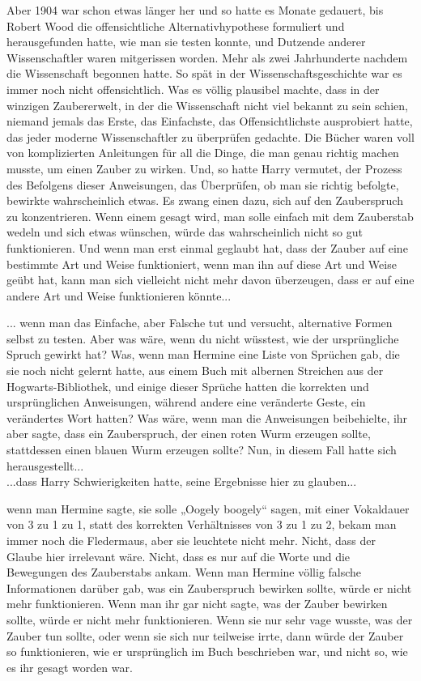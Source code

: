 {Aber 1904 war schon etwas länger her und so hatte es Monate gedauert, bis Robert Wood die offensichtliche Alternativhypothese formuliert und herausgefunden hatte, wie man sie testen konnte, und Dutzende anderer Wissenschaftler waren mitgerissen worden. Mehr als zwei Jahrhunderte nachdem die Wissenschaft begonnen hatte. So spät in der Wissenschaftsgeschichte war es immer noch nicht offensichtlich. Was es völlig plausibel machte, dass in der winzigen Zaubererwelt, in der die Wissenschaft nicht viel bekannt zu sein schien, niemand jemals das Erste, das Einfachste, das Offensichtlichste ausprobiert hatte, das jeder moderne Wissenschaftler zu überprüfen gedachte. Die Bücher waren voll von komplizierten Anleitungen für all die Dinge, die man genau richtig machen musste, um einen Zauber zu wirken. Und, so hatte Harry vermutet, der Prozess des Befolgens dieser Anweisungen, das Überprüfen, ob man sie richtig befolgte, bewirkte wahrscheinlich etwas. Es zwang einen dazu, sich auf den Zauberspruch zu konzentrieren. Wenn einem gesagt wird, man solle einfach mit dem Zauberstab wedeln und sich etwas wünschen, würde das wahrscheinlich nicht so gut funktionieren. Und wenn man erst einmal geglaubt hat, dass der Zauber auf eine bestimmte Art und Weise funktioniert, wenn man ihn auf diese Art und Weise geübt hat, kann man sich vielleicht nicht mehr davon überzeugen, dass er auf eine andere Art und Weise funktionieren könnte...

... wenn man das Einfache, aber Falsche tut und versucht, alternative Formen selbst zu testen. Aber was wäre, wenn du nicht wüsstest, wie der ursprüngliche Spruch gewirkt hat? Was, wenn man Hermine eine Liste von Sprüchen gab, die sie noch nicht gelernt hatte, aus einem Buch mit albernen Streichen aus der Hogwarts-Bibliothek, und einige dieser Sprüche hatten die korrekten und ursprünglichen Anweisungen, während andere eine veränderte Geste, ein verändertes Wort hatten? Was wäre, wenn man die Anweisungen beibehielte, ihr aber sagte, dass ein Zauberspruch, der einen roten Wurm erzeugen sollte, stattdessen einen blauen Wurm erzeugen sollte? Nun, in diesem Fall hatte sich herausgestellt...\\ ...dass Harry Schwierigkeiten hatte, seine Ergebnisse hier zu glauben...

wenn man Hermine sagte, sie solle „Oogely boogely“ sagen, mit einer Vokaldauer von 3 zu 1 zu 1, statt des korrekten Verhältnisses von 3 zu 1 zu 2, bekam man immer noch die Fledermaus, aber sie leuchtete nicht mehr. Nicht, dass der Glaube hier irrelevant wäre. Nicht, dass es nur auf die Worte und die Bewegungen des Zauberstabs ankam. Wenn man Hermine völlig falsche Informationen darüber gab, was ein Zauberspruch bewirken sollte, würde er nicht mehr funktionieren. Wenn man ihr gar nicht sagte, was der Zauber bewirken sollte, würde er nicht mehr funktionieren. Wenn sie nur sehr vage wusste, was der Zauber tun sollte, oder wenn sie sich nur teilweise irrte, dann würde der Zauber so funktionieren, wie er ursprünglich im Buch beschrieben war, und nicht so, wie es ihr gesagt worden war.

}
